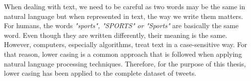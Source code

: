 
When dealing with text, we need to be careful as two words may be the same in natural language but when represented in text, the way we write them matters. For humans, the words \textit{"sports", "SPORTS" or "Sports"} are basically the same word. Even though they are written differently, their meaning is the same. However, computers, especially algorithms, treat text in a case-sensitive way. For that reason, lower casing is a common approach that is followed when applying natural language processing techniques. Therefore, for the purpose of this thesis, lower casing has been applied to the complete dataset of tweets.

